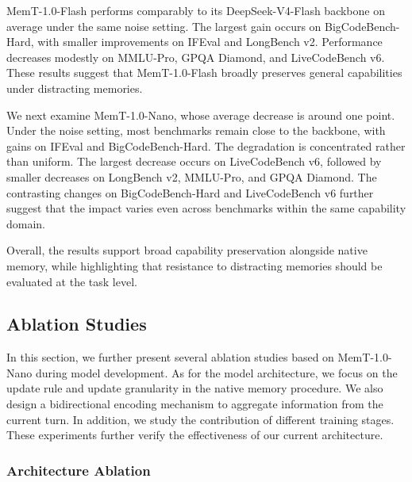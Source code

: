 MemT-1.0-Flash performs comparably to its DeepSeek-V4-Flash backbone on average under the same noise setting.
The largest gain occurs on BigCodeBench-Hard, with smaller improvements on IFEval and LongBench v2.
Performance decreases modestly on MMLU-Pro, GPQA Diamond, and LiveCodeBench v6.
These results suggest that MemT-1.0-Flash broadly preserves general capabilities under distracting memories.

We next examine MemT-1.0-Nano, whose average decrease is around one point.
Under the noise setting, most benchmarks remain close to the backbone, with gains on IFEval and BigCodeBench-Hard.
The degradation is concentrated rather than uniform.
The largest decrease occurs on LiveCodeBench v6, followed by smaller decreases on LongBench v2, MMLU-Pro, and GPQA Diamond.
The contrasting changes on BigCodeBench-Hard and LiveCodeBench v6 further suggest that the impact varies even across benchmarks within the same capability domain.

Overall, the results support broad capability preservation alongside native memory, while highlighting that resistance to distracting memories should be evaluated at the task level.



\subsection{Ablation Studies}
In this section, we further present several ablation studies based on MemT-1.0-Nano during model development.
As for the model architecture, we focus on the update rule and update granularity in the native memory procedure.
We also design a bidirectional encoding mechanism to aggregate information from the current turn.
In addition, we study the contribution of different training stages.
These experiments further verify the effectiveness of our current architecture.

\subsubsection{Architecture Ablation}

